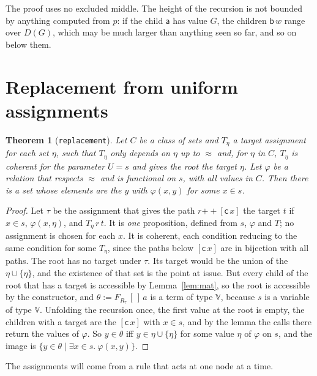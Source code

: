 \documentclass[10pt]{article}
\newtheorem{theorem}{Theorem}[section]
\theoremstyle{definition}
\theoremstyle{remark}
\newcommand{\V}{\mathbb{V}}
\newcommand{\la}{\mathsf{a}}
\newcommand{\lb}{\mathsf{b}}
\newcommand{\lc}{\mathsf{c}}
\newcommand{\lean}[1]{\texttt{#1}}
\begin{document}
The proof uses no excluded middle. The height of the recursion is not
bounded by anything computed from $p$: if the child $\la$ has value $G$,
the children $\lb\,w$ range over $D(G)$, which may be much larger than
anything seen so far, and so on below them.

\section{Replacement from uniform assignments}\label{sec:repl}

\begin{theorem}[\lean{replacement}]\label{thm:repl}
Let $C$ be a class of sets and $T_\eta$ a target assignment for each set
$\eta$, such that $T_\eta$ only depends on $\eta$ up to $\approx$ and, for $\eta$ in $C$,
$T_\eta$ is coherent for the parameter $U=s$ and gives the root the
target $\eta$. Let $\varphi$ be a relation that respects $\approx$ and is functional
on $s$, with all values in $C$. Then there is a set whose elements are
the $y$ with $\varphi(x,y)$ for some $x\in s$.
\end{theorem}
\begin{proof}
Let $\tau$ be the assignment that gives the path $r\mathbin{+\!\!+}[\lc\,x]$ the
target $t$ if $x\in s$, $\varphi(x,\eta)$, and $T_\eta\,r\,t$. It is \emph{one}
proposition, defined from $s$, $\varphi$ and $T$; no assignment is chosen for
each $x$. It is coherent, each condition reducing to the same condition
for some $T_\eta$, since the paths below $[\lc\,x]$ are in bijection with all
paths. The root has no target under $\tau$. Its target would be the union
of the $\eta\cup\{\eta\}$, and the existence of that set is the point at
issue. But every child of the root that has a target is accessible by
Lemma~\ref{lem:mat}, so the root is accessible by the constructor, and
$\theta:=F_{R_\tau}\,[\,]\,a$ is a term of type $\V$, because $s$ is a
variable of type $\V$. Unfolding the recursion once, the first value at
the root is empty, the children with a target are the $[\lc\,x]$ with
$x\in s$, and by the lemma the calls there return the values of $\varphi$. So
$y\in\theta$ iff $y\in\eta\cup\{\eta\}$ for some value $\eta$ of $\varphi$ on $s$, and the image is
$\{y\in\theta\mid\exists x\in s.\ \varphi(x,y)\}$.
\end{proof}

The assignments will come from a rule that acts at one node at a time.
\end{document}
